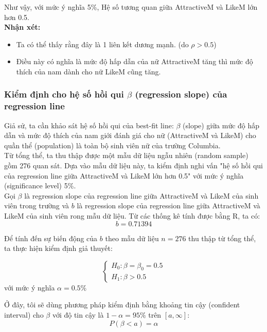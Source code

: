 \documentclass[a4paper,12pt]{article}
\begin{document}
	Như vậy, với mức ý nghĩa 5\%, Hệ số tương quan giữa AttractiveM và LikeM lớn hơn 0.5.\\
		
	\textbf{Nhận xét:}
	\begin{itemize}
		\item Ta có thể thấy rằng đây là 1 liên kết dương mạnh. (do $\rho > 0.5$) 
		\item Điều này có nghĩa là mức độ hấp dẫn của nữ AttractiveM tăng thì mức độ thích của nam dành cho nữ LikeM cũng tăng.
	\end{itemize}
	
	\subsubsection{Kiểm định cho hệ số hồi qui $\beta$ (regression slope) của regression line}
	
	Giả sử, ta cần khảo sát hệ số hồi qui của best-fit line: $\beta$ (slope) giữa mức độ hấp dẫn và mức độ thích của nam giới đánh giá cho nữ (AttractiveM và LikeM) cho quần thể (population) là toàn bộ sinh viên nữ của trường Columbia.\\
	
	Từ tổng thể, ta thu thập được một mẫu dữ liệu ngẫu nhiên (random sample) gồm 276 quan sát. Dựa vào mẫu dữ liệu này, ta kiểm định nghi vấn "hệ số hồi qui của regression line giữa AttractiveM và LikeM lớn hơn 0.5" với mức ý nghĩa (significance level) 5\%.\\
	
	Gọi $\beta$ là regression slope của regression line giữa AttractiveM và LikeM của sinh viên trong trường và $b$ là regression slope của regression line giữa AttractiveM và LikeM của sinh viên rong mẫu dữ liệu. Từ các thống kê tính được bằng R, ta có: 
	$$b = 0.71394$$
	
	Để tính đến sự biến động của $b$ theo mẫu dữ liệu $n = 276$ thu thập từ tổng thể, ta thực hiện kiểm định giả thuyết:
	
	\begin{equation*}
	\begin{cases}
	H_0: \beta = \beta_0 = 0.5\\
	H_1: \beta > 0.5
	\end{cases}
	\end{equation*}
	với mức ý nghĩa $\alpha = 0.5\%$
	
	Ở đây, tôi sẽ dùng phương pháp kiểm định bằng khoảng tin cậy (confident interval) cho $\beta$ với độ tin cậy là $1 - \alpha = 95\%$ trên $[a, \infty]$:
	$$P(\beta < a) = \alpha$$
	
\end{document}
